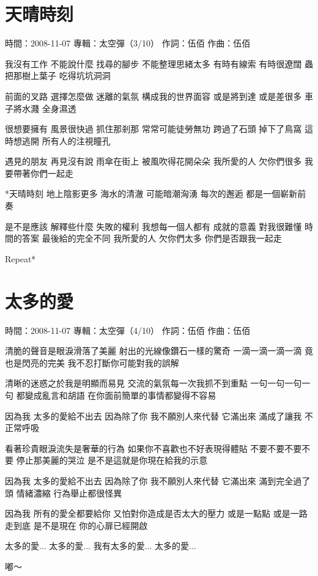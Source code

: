 \documentclass[UTF8,a4paper,oneside,twocolumn,12pt]{ctexbook}
\newcommand{\infopair}[2]{\textbullet #1：#2}
\newcommand{\zc}[1][伍佰]{\infopair{作詞}{#1}}
\newcommand{\zq}[1][伍佰]{\infopair{作曲}{#1}}
\newcommand{\zj}[1]{\infopair{專輯}{#1}}
\newcommand{\sj}[1]{\infopair{時間}{#1}}
\newenvironment{info}{\begin{flushleft}\kaishu
	}
	{\end{flushleft}\normalsize\yahei\par}
\newenvironment{lyric}{
	}
{}
\begin{document}
\section{天晴時刻}
\begin{info}
	\sj{2008-11-07}
	\zj{太空彈（3/10）}
	\zc
	\zq
\end{info}
\begin{lyric}
	我沒有工作 不能說什麼
	找尋的腳步 不能整理思緒太多
	有時有線索 有時很遼闊
	蟲把那樹上葉子 吃得坑坑洞洞

	前面的叉路 選擇怎麼做
	迷離的氣氛 構成我的世界面容
	或是將到達 或是差很多
	車子將水濺 全身濕透

	很想要擁有 風景很快過
	抓住那剎那 常常可能徒勞無功
	跨過了石頭 掉下了鳥窩
	這時想逃開 所有人的注視瞳孔

	遇見的朋友 再見沒有說
	雨傘在街上 被風吹得花開朵朵
	我所愛的人 欠你們很多
	我要帶著你們一起走

	*天晴時刻 地上陰影更多
	海水的清澈 可能暗潮洶湧
	每次的邂逅 都是一個嶄新前奏

	是不是應該 解釋些什麼
	失敗的權利 我想每一個人都有
	成就的意義 對我很難懂
	時間的答案 最後給的完全不同
	我所愛的人 欠你們太多
	你們是否跟我一起走

	Repeat*
\end{lyric}

\section{太多的愛}
\begin{info}
	\sj{2008-11-07}
	\zj{太空彈（4/10）}
	\zc
	\zq
\end{info}
\begin{lyric}
	清脆的聲音是眼淚滑落了美麗
	射出的光線像鑽石一樣的驚奇
	一滴一滴一滴一滴
	竟也是閃亮的完美
	我不忍打斷你可能對我的誤解

	清晰的迷惑之於我是明顯而易見
	交流的氣氛每一次我抓不到重點
	一句一句一句一句
	都變成亂言和胡語
	在你面前簡單的事情都變得不容易

	因為我 太多的愛給不出去
	因為除了你 我不願別人來代替
	它滿出來 滿成了讓我 不正常呼吸

	看著珍貴眼淚流失是奢華的行為
	如果你不喜歡也不好表現得體貼
	不要不要不要不要
	停止那美麗的哭泣
	是不是這就是你現在給我的示意

	因為我 太多的愛給不出去
	因為除了你 我不願別人來代替
	它滿出來 滿到完全過了頭
	情緒濃縮 行為舉止都很怪異

	因為我 所有的愛全都要給你
	又怕對你造成是否太大的壓力
	或是一點點 或是一路走到底
	是不是現在 你的心扉已經開啟

	太多的愛... 太多的愛...
	我有太多的愛... 太多的愛...

	嘟～
\end{lyric}
\end{document}
